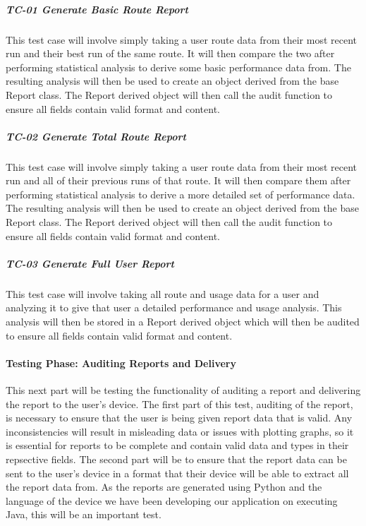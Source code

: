 ﻿\documentclass{article}
\begin{document}
\subparagraph{TC-01 Generate Basic Route Report}
This test case will involve simply taking a user route data from their most recent run and their best run of the same route. It will then compare the two after performing statistical analysis to derive some basic performance data from. The resulting analysis will then be used to create an object derived from the base Report class. The Report derived object will then call the audit function to ensure all fields contain valid format and content.

\subparagraph{TC-02 Generate Total Route Report}
This test case will involve simply taking a user route data from their most recent run and all of their previous runs of that route. It will then compare them after performing statistical analysis to derive a more detailed set of performance data. The resulting analysis will then be used to create an object derived from the base Report class. The Report derived object will then call the audit function to ensure all fields contain valid format and content.

\subparagraph{TC-03 Generate Full User Report}
This test case will involve taking all route and usage data for a user and analyzing it to give that user a detailed performance and usage analysis. This analysis will then be stored in a Report derived object which will then be audited to ensure all fields contain valid format and content.

\paragraph{Testing Phase: Auditing Reports and Delivery}
This next part will be testing the functionality of auditing a report and delivering the report to the user's device. The first part of this test, auditing of the report, is necessary to ensure that the user is being given report data that is valid. Any inconsistencies will result in misleading data or issues with plotting graphs, so it is essential for reports to be complete and contain valid data and types in their repsective fields. The second part will be to ensure that the report data can be sent to the user's device in a format that their device will be able to extract all the report data from. As the reports are generated using Python and the language of the device we have been developing our application on executing Java, this will be an important test.
\end{document}

